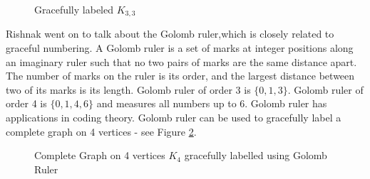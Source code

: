 \begin{figure}
\begin{center}

\caption{Gracefully labeled $K_{3,3}$}\label{18g45}
\end{center}
\end{figure}
Rishnak went on to talk about the Golomb ruler,which is closely related to graceful numbering.  A Golomb ruler is a set of marks at integer positions along an imaginary ruler such that no two pairs of marks are the same distance apart. The number of marks on the ruler is its order, and the largest distance between two of its marks is its length.
Golomb ruler of order 3 is $\{0,1,3\}$. Golomb ruler of order 4 is $\{0,1,4,6\}$ and measures all numbers up to 6. Golomb ruler has applications in coding theory. Golomb ruler can be used to gracefully label a complete graph on 4 vertices - see Figure \ref{19g5}.
\begin{figure}
\begin{center}


\caption{Complete Graph on 4 vertices $K_4$ gracefully labelled using Golomb Ruler}\label{19g5}
\end{center}
\end{figure}

